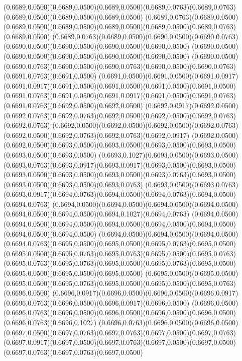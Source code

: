 (0.6689,0.0500)(0.6689,0.0500)(0.6689,0.0500)(0.6689,0.0763)(0.6689,0.0763)(0.6689,0.0500)(0.6689,0.0500)(0.6689,0.0500)
(0.6689,0.0763)(0.6689,0.0500)(0.6689,0.0500)(0.6689,0.0500)(0.6689,0.0500)(0.6689,0.0500)(0.6689,0.0763)(0.6689,0.0500)
(0.6689,0.0763)(0.6689,0.0500)(0.6690,0.0500)(0.6690,0.0763)(0.6690,0.0500)(0.6690,0.0500)(0.6690,0.0500)(0.6690,0.0500)
(0.6690,0.0500)(0.6690,0.0500)(0.6690,0.0500)(0.6690,0.0500)(0.6690,0.0500)
\PST@Solid(0.6690,0.0500)(0.6690,0.0763)(0.6690,0.0500)(0.6690,0.0763)(0.6690,0.0500)(0.6690,0.0763)(0.6691,0.0763)(0.6691,0.0500)
(0.6691,0.0500)(0.6691,0.0500)(0.6691,0.0917)(0.6691,0.0917)(0.6691,0.0500)(0.6691,0.0500)(0.6691,0.0500)(0.6691,0.0500)
(0.6691,0.0763)(0.6691,0.0500)(0.6691,0.0917)(0.6691,0.0500)(0.6691,0.0763)(0.6691,0.0763)(0.6692,0.0500)(0.6692,0.0500)
(0.6692,0.0917)(0.6692,0.0500)(0.6692,0.0763)(0.6692,0.0763)(0.6692,0.0500)(0.6692,0.0500)(0.6692,0.0763)(0.6692,0.0763)
(0.6692,0.0500)(0.6692,0.0500)(0.6692,0.0500)(0.6692,0.0763)(0.6692,0.0500)(0.6692,0.0763)(0.6692,0.0763)(0.6692,0.0917)
(0.6692,0.0500)(0.6692,0.0500)(0.6693,0.0500)(0.6693,0.0500)(0.6693,0.0500)(0.6693,0.0500)(0.6693,0.0500)(0.6693,0.0500)
(0.6693,0.1027)(0.6693,0.0500)(0.6693,0.0500)(0.6693,0.0763)(0.6693,0.0917)(0.6693,0.0917)(0.6693,0.0500)(0.6693,0.0500)
(0.6693,0.0500)(0.6693,0.0500)(0.6693,0.0500)(0.6693,0.0763)(0.6693,0.0500)(0.6693,0.0500)(0.6693,0.0500)(0.6693,0.0763)
(0.6693,0.0500)(0.6693,0.0763)(0.6693,0.0917)(0.6694,0.0763)(0.6694,0.0500)(0.6694,0.0763)(0.6694,0.0500)(0.6694,0.0763)
(0.6694,0.0500)(0.6694,0.0500)(0.6694,0.0500)(0.6694,0.0500)(0.6694,0.0500)(0.6694,0.0500)(0.6694,0.1027)(0.6694,0.0763)
(0.6694,0.0500)(0.6694,0.0500)(0.6694,0.0500)(0.6694,0.0500)(0.6694,0.0500)(0.6694,0.0500)(0.6694,0.0500)(0.6694,0.0500)
(0.6694,0.0500)(0.6694,0.0500)(0.6694,0.0500)(0.6694,0.0763)(0.6695,0.0500)(0.6695,0.0500)(0.6695,0.0763)(0.6695,0.0500)
(0.6695,0.0500)(0.6695,0.0763)(0.6695,0.0763)(0.6695,0.0500)(0.6695,0.0763)
\PST@Solid(0.6695,0.0763)(0.6695,0.0763)(0.6695,0.0500)(0.6695,0.0763)(0.6695,0.0500)(0.6695,0.0500)(0.6695,0.0500)(0.6695,0.0500)
(0.6695,0.0500)(0.6695,0.0500)(0.6695,0.0500)(0.6695,0.0763)(0.6695,0.0500)(0.6695,0.0500)(0.6695,0.0763)(0.6696,0.0500)
(0.6696,0.0917)(0.6696,0.0500)(0.6696,0.0500)(0.6696,0.0917)(0.6696,0.0763)(0.6696,0.0500)(0.6696,0.0917)(0.6696,0.0500)
(0.6696,0.0500)(0.6696,0.0763)(0.6696,0.0500)(0.6696,0.0500)(0.6696,0.0500)(0.6696,0.0500)(0.6696,0.0763)(0.6696,0.1027)
(0.6696,0.0763)(0.6696,0.0500)(0.6696,0.0500)(0.6697,0.0500)(0.6697,0.0763)(0.6697,0.0763)(0.6697,0.0500)(0.6697,0.0763)
(0.6697,0.0917)(0.6697,0.0500)(0.6697,0.0763)(0.6697,0.0500)(0.6697,0.0500)(0.6697,0.0763)(0.6697,0.0763)(0.6697,0.0500)
